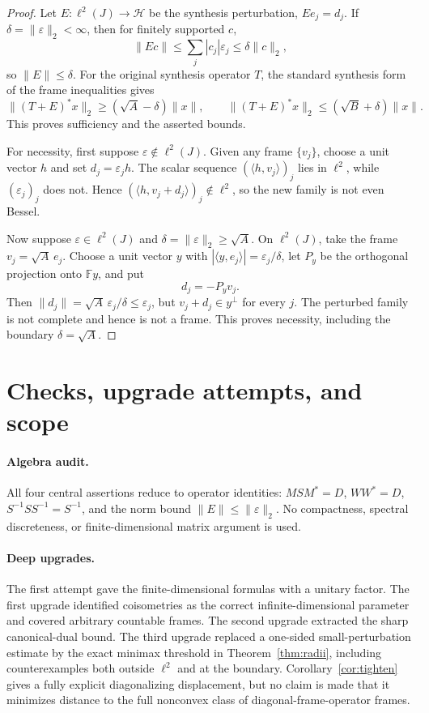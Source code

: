 \documentclass[11pt]{article}
\newcommand{\HH}{\mathcal H}
\newcommand{\ellJ}{\ell^2(J)}
\begin{document}
\begin{proof}
Let \(E:\ellJ\to\HH\) be the synthesis perturbation, \(Ee_j=d_j\). If
\(\delta=\|\varepsilon\|_2<\infty\), then for finitely supported \(c\),
\[
 \|Ec\|\le\sum_j|c_j|\varepsilon_j\le\delta\|c\|_2,
\]
so \(\|E\|\le\delta\). For the original synthesis operator \(T\), the
standard synthesis form of the frame inequalities gives
\[
 \|(T+E)^*x\|_2\ge(\sqrt A-\delta)\|x\|,
 \qquad
 \|(T+E)^*x\|_2\le(\sqrt B+\delta)\|x\|.
\]
This proves sufficiency and the asserted bounds.

For necessity, first suppose \(\varepsilon\notin\ell^2(J)\). Given any
frame \(\{v_j\}\), choose a unit vector \(h\) and set
\(d_j=\varepsilon_jh\). The scalar sequence
\((\langle h,v_j\rangle)_j\) lies in \(\ell^2\), while
\((\varepsilon_j)_j\) does not. Hence
\((\langle h,v_j+d_j\rangle)_j\notin\ell^2\), so the new family is not even
Bessel.

Now suppose \(\varepsilon\in\ell^2(J)\) and
\(\delta=\|\varepsilon\|_2\ge\sqrt A\). On \(\ell^2(J)\), take the frame
\(v_j=\sqrt A\,e_j\). Choose a unit vector \(y\) with
\(|\langle y,e_j\rangle|=\varepsilon_j/\delta\), let \(P_y\) be the
orthogonal projection onto \(\mathbb F y\), and put
\[
 d_j=-P_yv_j.
\]
Then \(\|d_j\|=\sqrt A\,\varepsilon_j/\delta\le\varepsilon_j\), but
\(v_j+d_j\in y^\perp\) for every \(j\). The perturbed family is not
complete and hence is not a frame. This proves necessity, including the
boundary \(\delta=\sqrt A\).
\end{proof}

\section{Checks, upgrade attempts, and scope}

\paragraph{Algebra audit.}
All four central assertions reduce to operator identities: \(MSM^*=D\),
\(WW^*=D\), \(S^{-1}SS^{-1}=S^{-1}\), and the norm bound
\(\|E\|\le\|\varepsilon\|_2\). No compactness, spectral discreteness, or
finite-dimensional matrix argument is used.

\paragraph{Deep upgrades.}
The first attempt gave the finite-dimensional formulas with a unitary
factor. The first upgrade identified coisometries as the correct
infinite-dimensional parameter and covered arbitrary countable frames.
The second upgrade extracted the sharp canonical-dual bound. The third
upgrade replaced a one-sided small-perturbation estimate by the exact
minimax threshold in Theorem~\ref{thm:radii}, including counterexamples both
outside \(\ell^2\) and at the boundary. Corollary~\ref{cor:tighten} gives a
fully explicit diagonalizing displacement, but no claim is made that it
minimizes distance to the full nonconvex class of diagonal-frame-operator
frames.
\end{document}
